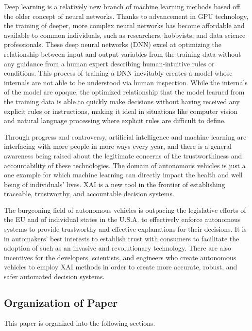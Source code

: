 Deep learning is a relatively new branch of machine learning methods based off the older concept of neural networks.  Thanks to advancement in GPU technology, the training of deeper, more complex neural networks has become affordable and available to common individuals, such as researchers, hobbyists, and data science professionals.  These deep neural networks (DNN) excel at optimizing the relationship between input and output variables from the training data without any guidance from a human expert describing human-intuitive rules or conditions.  This process of training a DNN inevitably creates a model whose internals are not able to be  understood via human inspection.  While the internals of the model are opaque, the optimized relationship that the model learned from the training data is able to quickly make decisions without having received any explicit rules or instructions, making it ideal in situations like computer vision and natural language processing where explicit rules are difficult to define.

Through progress and controversy, artificial intelligence and machine learning are interfacing with more people in more ways every year, and there is a general awareness being raised about the legitimate concerns of the trustworthiness and accountability of these technologies.  The domain of autonomous vehicles is just a one example for which machine learning can directly impact the health and well being of individuals' lives.  XAI is a new tool in the frontier of establishing traceable, trustworthy, and accountable decision systems.

The burgeoning field of autonomous vehicles is outpacing the legislative efforts of the EU and of individual states in the U.S.A. to effectively enforce autonomous systems to provide trustworthy and effective explanations for their decisions.  It is in automakers' best interests to establish trust with consumers to facilitate the adoption of such as an invasive and revolutionary technology.  There are also incentives for the developers, scientists, and engineers who create autonomous vehicles to employ XAI methods in order to create more accurate, robust, and safer automated decision systems.

\subsection{Organization of Paper}

This paper is organized into the following sections.

